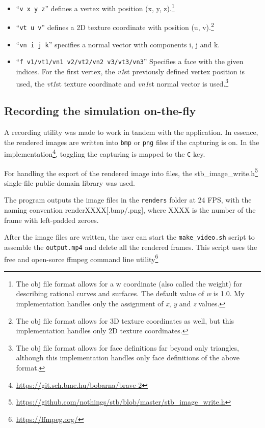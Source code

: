 \documentclass[sigplan,screen,nonacm]{acmart}
\begin{document}
\newcommand{\vFootNote}{\footnote{The obj file format allows for a w coordinate
(also called the weight) for describing rational curves and surfaces. The
default value of \textit{w} is 1.0. My implementation handles only the
assignment of \textit{x}, \textit{y} and \textit{z} values.}}

\newcommand{\vtFootNote}{\footnote{The obj file format allows for 3D texture
coordinates as well, but this implementation handles only 2D texture
coordinates.}}

\newcommand{\fFootNote}{\footnote{The obj file format allows for face
definitions far beyond only triangles, although this implementation handles only
face definitions of the above format.}}

\begin{itemize}
    \item ``\verb|v x y z|'' defines a vertex with position (x, y, z).\vFootNote 
    \item ``\verb|vt u v|'' defines a 2D texture coordinate with position (u,
        v).\vtFootNote 
    \item ``\verb|vn i j k|'' specifies a normal vector with components i, j and
        k.  
    \item ``\verb|f v1/vt1/vn1 v2/vt2/vn2 v3/vt3/vn3|'' Specifies a face with the
        given indices. For the first vertex, the \textit{v1}st previously
        defined vertex position is used, the \textit{vt1}st texture coordinate
        and \textit{vn1}st normal vector is used.\fFootNote
\end{itemize}


\subsection{Recording the simulation on-the-fly}
A recording utility was made to work in tandem with the application. In essence,
the rendered images are written into \texttt{bmp} or \texttt{png} files if the
capturing is on. In the
implementation\footnote{\url{https://git.sch.bme.hu/bobarna/brave-2}}, toggling
the capturing is mapped to the \texttt{C} key.


For handling the export of the rendered image into files, the
stb\_image\_write.h\footnote{\url{https://github.com/nothings/stb/blob/master/stb\_image\_write.h}}
single-file public domain library was used. 


The program outputs the image files in the \texttt{renders} folder at 24 FPS,
with the naming convention renderXXXX[.bmp/.png], where XXXX is the number of
the frame with left-padded zeroes.


After the image files are written, the user can start the
\texttt{make\_video.sh} script to assemble the \texttt{output.mp4} and delete
all the rendered frames. This script uses the free and open-sorce ffmpeg command
line utility\footnote{\url{https://ffmpeg.org/}}
\end{document}
